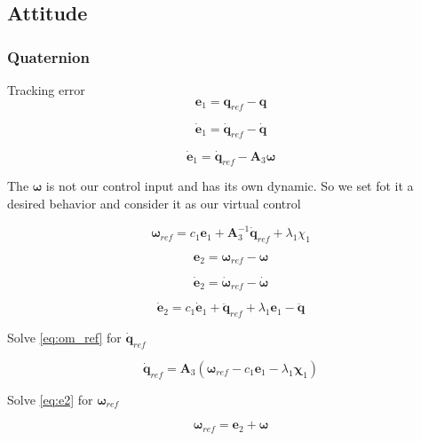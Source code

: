 \subsection{Attitude}

\subsubsection{Quaternion}

Tracking error
\[
\mathbf{e}_1 = \mathbf{q}_{ref} - \mathbf{q}
\]

\[
\dot{\mathbf{e}}_1 = \dot{\mathbf{q}}_{ref} - \dot{\mathbf{q}}
\]

\begin{equation}
\dot{\mathbf{e}}_1 = \dot{\mathbf{q}}_{ref} - \mathbf{A}_3 \boldsymbol\omega
\label{eq:e1_dyn}
\end{equation}

The $\boldsymbol\omega$ is not our control input and has its own dynamic.
So we set fot it a desired behavior and consider it as our virtual control

\begin{equation}
\boldsymbol\omega_{ref} = c_1 \mathbf{e}_1 + \mathbf{A}_3^{-1} \dot{\mathbf{q}}_{ref} + \lambda_1 \chi_1
\label{eq:om_ref}
\end{equation}

\begin{equation}
\mathbf{e}_2 = \boldsymbol\omega_{ref} - \boldsymbol\omega
\label{eq:e2}
\end{equation}

\[
\dot{\mathbf{e}}_2 = \dot{\boldsymbol\omega}_{ref} - \dot{\boldsymbol\omega}
\]

\begin{equation}
\dot{\mathbf{e}}_2 = c_1 \dot{\mathbf{e}}_1 + \ddot{\mathbf{q}}_{ref} + \lambda_1 \mathbf{e}_1 - \ddot{\mathbf{q}}
\label{eq:e2_dyn}
\end{equation}



Solve \eqref{eq:om_ref} for $\dot{\mathbf{q}}_{ref}$

\begin{equation}
\dot{\mathbf{q}}_{ref} = \mathbf{A}_3 \left( \boldsymbol\omega_{ref} - c_1 \mathbf{e}_1 - \lambda_1 \boldsymbol\chi_1 \right)
\label{eq:om_ref_2}
\end{equation}

Solve \eqref{eq:e2} for $\boldsymbol\omega_{ref}$

\begin{equation}
\boldsymbol\omega_{ref} = \mathbf{e}_2 + \boldsymbol\omega
\label{eq:e2_2}
\end{equation}

